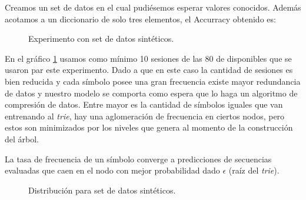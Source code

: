 
	Creamos un set de datos en el cual pudiésemos esperar valores conocidos. Además acotamos a un diccionario de solo tres elementos, el Accurracy obtenido es:
	
	
	
	\begin{figure}[h] 
		\centering
		\caption{Experimento con set de datos sintéticos.}
		\label{fig:graph-exp1}
	\end{figure}
	

	
 
	
	En el gráfico \ref{fig:graph-exp1} usamos como mínimo 10 sesiones de las 80 de disponibles que se usaron par este experimento. Dado a que en este caso la cantidad de sesiones es bien reducida y cada símbolo posee una gran frecuencia existe mayor redundancia de datos y nuestro modelo se comporta como espera que lo haga un algoritmo de compresión de datos. Entre mayor es la cantidad de símbolos iguales
	que van entrenando al \emph{trie}, hay una aglomeración de frecuencia en ciertos nodos, pero estos son minimizados por los niveles que genera al momento de la construcción del árbol.
	
	La tasa de frecuencia de un símbolo converge a predicciones de secuencias evaluadas que caen en el nodo con mejor probabilidad dado $\epsilon$ (raíz del \emph{trie}).
	



	
   \begin{figure}[h] 
	   \centering
		\caption{Distribución para set de datos sintéticos.}
		\label{fig:bar-chart-data-sintetica}
	\end{figure}



